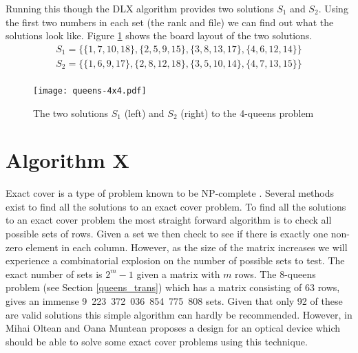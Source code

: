 \begin{example}
Running this though the DLX algorithm provides two solutions $S_1$ and $S_2$.
Using the first two numbers in each set (the rank and file) we can find out what the solutions look like.
Figure \ref{fig:4queens} shows the board layout of the two solutions.
\begin{align*}
S_1 = \{ \{ 1, 7, 10, 18 \}, \{ 2, 5, 9, 15 \}, \{ 3, 8, 13, 17 \}, \{ 4, 6, 12, 14 \}  \}	\\
S_2 = \{ \{ 1, 6, 9, 17 \}, \{ 2, 8, 12, 18 \}, \{ 3, 5, 10, 14 \}, \{ 4, 7, 13, 15 \}  \}	\\
\end{align*}

\begin{figure}[hptb]
	\centering 
	\texttt{[image: queens-4x4.pdf]}
	\caption{The two solutions $S_1$ (left) and $S_2$ (right) to the 4-queens problem}
	\label{fig:4queens}
\end{figure}

\end{example}



\section{Algorithm X}
\label{algox}

Exact cover is a type of problem known to be NP-complete \cite{np-comp-theory}.
Several methods exist to find all the solutions to an exact cover problem.
To find all the solutions to an exact cover problem the most straight forward algorithm is to check all possible sets of rows.
Given a set we then check to see if there is exactly one non-zero element in each column.
However, as the size of the matrix increases we will experience a combinatorial explosion on the number of possible sets to test.
The exact number of sets is $2^{m}-1$ given a matrix with $m$ rows.
The 8-queens problem (see Section \ref{queens_trans}) which has a matrix consisting of 63 rows, gives an immense 9~223~372~036~854~775~808 sets.
Given that only 92 of these are valid solutions this simple algorithm can hardly be recommended.
However, in \cite{oltean-2007} Mihai Oltean and Oana Muntean proposes a design for an optical device which should be able to solve some exact cover problems using this technique.

